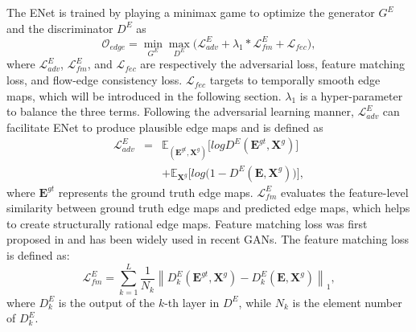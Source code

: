The ENet is trained by playing a minimax game to optimize the generator $G^E$ and the discriminator $D^E$ as
\begin{equation}
\label{eq:loss_e}
\mathcal{O}_{edge} =\min\limits_{G^E} \max \limits_{D^E} \big(\mathcal{L}^E_{adv}+\lambda_1 * \mathcal{L}^E_{fm}+\mathcal{L}_{fec}\big),
\end{equation}
where $\mathcal{L}^E_{adv}$, $\mathcal{L}^E_{fm}$, and $\mathcal{L}_{fec}$ are respectively the adversarial loss, feature matching loss, and flow-edge consistency loss. $\mathcal{L}_{fec}$ targets to temporally smooth edge maps, which will be introduced in the following section.
$\lambda_1$ is a hyper-parameter to balance the three terms.
%
Following the adversarial learning manner, $\mathcal{L}^E_{adv}$ can facilitate ENet to produce plausible edge maps and is defined as
\begin{equation} \label{eq:edge_adver}
\begin{aligned} 
\mathcal{L}^E_{adv} & =&\mathbb{E}_{(\boldsymbol{E}^{gt},\boldsymbol{X}^{g})}\big[logD^E(\boldsymbol{E}^{gt},\boldsymbol{X}^{g})\big]\\ 
&&+\mathbb{E}_{\boldsymbol{X}^{g}}\big[log\big(1-D^E ( \boldsymbol{E},\boldsymbol{X}^{g})\big)\big],
\end{aligned}
\end{equation}
where $\boldsymbol{E}^{gt}$ represents the ground truth edge maps. $\mathcal{L}^E_{fm}$ evaluates the feature-level similarity between ground truth edge maps and predicted edge maps, which helps to create structurally rational edge maps. 
Feature matching loss was first proposed in \cite{wang2018high} and has been widely used in recent GANs.
The feature matching loss is defined as:
\begin{equation}
\label{eq:edge_fm}
\mathcal{L}^E_{fm}=\sum_{k=1}^L{\frac{1}{N_k}\left\| D^E_k(\boldsymbol{E}^{gt},\boldsymbol{X}^{g})- D^E_k(\boldsymbol{E},\boldsymbol{X}^{g})\right\|_1},
\end{equation}
where $D^E_k$ is the output of the $k$-th layer in $D^E$, while $N_k$ is the element number of $D^E_k$. 


